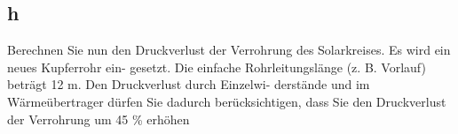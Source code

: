 \subsection{h}
Berechnen Sie nun den Druckverlust der Verrohrung des Solarkreises. Es wird ein neues Kupferrohr ein-
gesetzt. Die einfache Rohrleitungslänge (z. B. Vorlauf) beträgt 12 m. Den Druckverlust durch Einzelwi-
derstände und im Wärmeübertrager dürfen Sie dadurch berücksichtigen, dass Sie den Druckverlust der
Verrohrung um 45 \% erhöhen